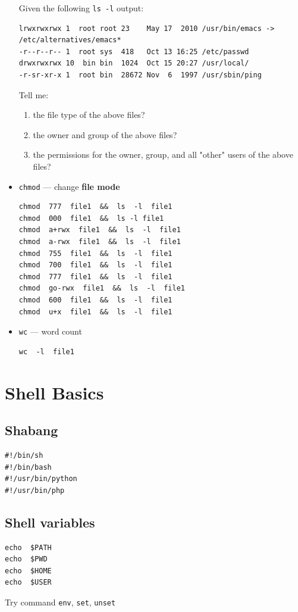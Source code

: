 \documentclass[12pt]{article}
\begin{document}
\begin{itemize}
Given the following \texttt{ls -l} output:
\begin{verbatim}
lrwxrwxrwx 1  root root 23    May 17  2010 /usr/bin/emacs -> /etc/alternatives/emacs*
-r--r--r-- 1  root sys  418   Oct 13 16:25 /etc/passwd
drwxrwxrwx 10  bin bin  1024  Oct 15 20:27 /usr/local/ 
-r-sr-xr-x 1  root bin  28672 Nov  6  1997 /usr/sbin/ping 
\end{verbatim}
Tell me:
\begin{enumerate}
\item the file type of the above files?
\item the owner and group of the above files?
\item the permissions for the owner, group, and all "other" users of the above files?
\end{enumerate}
\item \texttt{chmod} --- change \textbf{file mode}
\begin{verbatim}
chmod  777  file1  &&  ls  -l  file1
chmod  000  file1  &&  ls -l file1
chmod  a+rwx  file1  &&  ls  -l  file1
chmod  a-rwx  file1  &&  ls  -l  file1
chmod  755  file1  &&  ls  -l  file1
chmod  700  file1  &&  ls  -l  file1
chmod  777  file1  &&  ls  -l  file1
chmod  go-rwx  file1  &&  ls  -l  file1
chmod  600  file1  &&  ls  -l  file1
chmod  u+x  file1  &&  ls  -l  file1      
\end{verbatim}
\item \texttt{wc} --- word count
\begin{verbatim}
wc  -l  file1
\end{verbatim}
\end{itemize}
\section{Shell Basics}
\label{sec-2}
\subsection{Shabang}
\label{sec-2-1}
\begin{verbatim}
#!/bin/sh
#!/bin/bash
#!/usr/bin/python
#!/usr/bin/php
\end{verbatim}
\subsection{Shell variables}
\label{sec-2-2}
\begin{verbatim}
echo  $PATH
echo  $PWD
echo  $HOME
echo  $USER
\end{verbatim}
Try command \texttt{env}, \texttt{set}, \texttt{unset}
\end{document}
